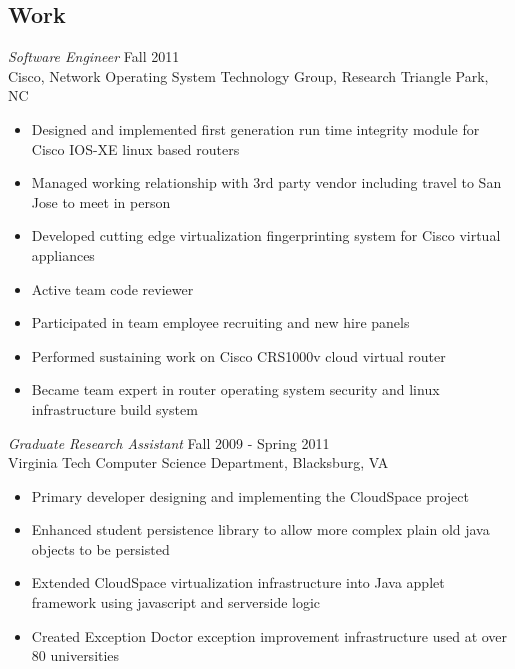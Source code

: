 \documentclass[line,margin]{res}
\begin{document}
\begin{resume}
\section{Work}
        {\sl Software Engineer} \hfill Fall 2011 \\
           Cisco, Network Operating System Technology Group, Research Triangle Park, NC
              \begin{itemize}  \itemsep -2pt %
                 \item Designed and implemented first generation run time integrity
                  module for Cisco IOS-XE linux based routers
                 \item Managed working relationship with 3rd party vendor including
                   travel to San Jose to meet in person
                 \item Developed cutting edge virtualization fingerprinting system for
                   Cisco virtual appliances
                 \item Active team code reviewer
                 \item Participated in team employee recruiting and new hire panels
                 \item Performed sustaining work on Cisco CRS1000v cloud virtual router
                 \item Became team expert in router operating system security and
                   linux infrastructure build system
              \end{itemize}
        {\sl Graduate Research Assistant} \hfill  Fall 2009 - Spring 2011 \\
           Virginia Tech Computer Science Department, Blacksburg, VA
              \begin{itemize} \itemsep -2pt %
                   \item Primary developer designing and implementing the CloudSpace project
                   \item Enhanced student persistence library to allow more
                     complex plain old java objects to be persisted
                   \item Extended CloudSpace virtualization infrastructure
                     into Java applet framework using javascript and serverside logic
                   \item Created Exception Doctor exception improvement infrastructure used at over 80 universities
              \end{itemize}

\end{resume}
\end{document}
